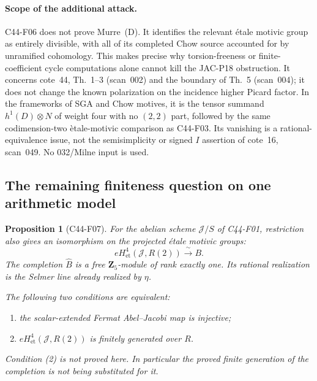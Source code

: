 \documentclass[11pt]{article}
\newtheorem{proposition}[theorem]{Proposition}
\theoremstyle{remark}\newtheorem{remark}[theorem]{Remark}
\begin{document}
\paragraph{Scope of the additional attack.}
C44-F06 does not prove Murre~(D).  It identifies the relevant
\'etale motivic group as entirely divisible, with all of its
completed Chow source accounted for by unramified cohomology.
This makes precise why torsion-freeness or finite-coefficient
cycle computations alone cannot kill the JAC-P18 obstruction.
It concerns cote~44, Th.~1--3 (scan~002) and the boundary of
Th.~5 (scan~004); it does not change the known polarization
on the incidence higher Picard factor.  In the frameworks of
SGA and Chow motives, it is the tensor summand
$h^1(D)\otimes N$ of weight four with no $(2,2)$ part,
followed by the same codimension-two \`etale-motivic comparison
as C44-F03.  Its vanishing is a rational-equivalence issue,
not the semisimplicity or signed $I$ assertion of cote~16,
scan~049.  No 032/Milne input is used.

\subsection{The remaining finiteness question on one arithmetic model}

\begin{proposition}[C44-F07]\label{C44-F07}
For the abelian scheme $\mathcal J/S$ of C44-F01, restriction
also gives an isomorphism on the projected \emph{\'etale
motivic} groups:
\[
 eH^4_{\mathrm{et}}(\mathcal J,R(2))
                 \xrightarrow{\ \sim\ } B.
                                                        \tag{F07.1}
\]
The completion $\widehat B$ is a free $\mathbf Z_5$-module
of rank exactly one.  Its rational realization is the Selmer
line already realized by $\eta$.

The following two conditions are equivalent:
\begin{enumerate}
\item the scalar-extended Fermat Abel--Jacobi map is injective;
\item $eH^4_{\mathrm{et}}(\mathcal J,R(2))$ is finitely
      generated over $R$.
\end{enumerate}
Condition (2) is not proved here.  In particular the proved
finite generation of the completion is not being substituted
for it.
\end{proposition}
\end{document}
